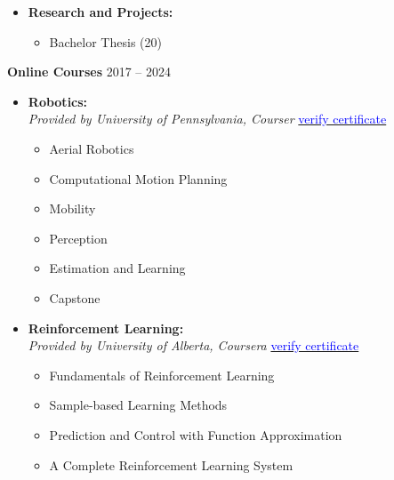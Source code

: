 \documentclass[12pt]{article}
\begin{document}
\begin{itemize}
    \item \textbf{Research and Projects:}\vspace{-4pt}
    \begin{multicols}{2}
    \begin{itemize}
        \item Bachelor Thesis (20)
    \end{itemize}
    \end{multicols}
\end{itemize}

\newpage
\noindent
{\bfseries Online Courses} 
\hfill 2017 -- 2024\\

\begin{itemize} \itemsep -1pt
	\item \textbf{Robotics:} \\
	\textit{Provided by University of Pennsylvania, Courser} \hfill 
	\href{https://coursera.org/share/169250f50fb50f44b803162274217f86}{\textcolor{blue}{verify certificate}}
	\begin{multicols}{2}
		\begin{itemize}
			\item Aerial Robotics
			\item Computational Motion Planning
			\item Mobility
			\item Perception
			\item Estimation and Learning
			\item Capstone
		\end{itemize}
		\end{multicols}
	\item \textbf{Reinforcement Learning:} \\
	\textit{Provided by University of Alberta, Coursera} \hfill 
	\href{https://www.coursera.org/account/accomplishments/specialization/LWJMD8VB28PZ?utm_source=link&utm_medium=certificate&utm_content=cert_image&utm_campaign=sharing_cta&utm_product=s12n}{\textcolor{blue}{verify certificate}}
		\begin{itemize}
			\item Fundamentals of Reinforcement Learning
			\item Sample-based Learning Methods
			\item Prediction and Control with Function Approximation
			\item A Complete Reinforcement Learning System
		\end{itemize}

\end{itemize}
\end{document}

